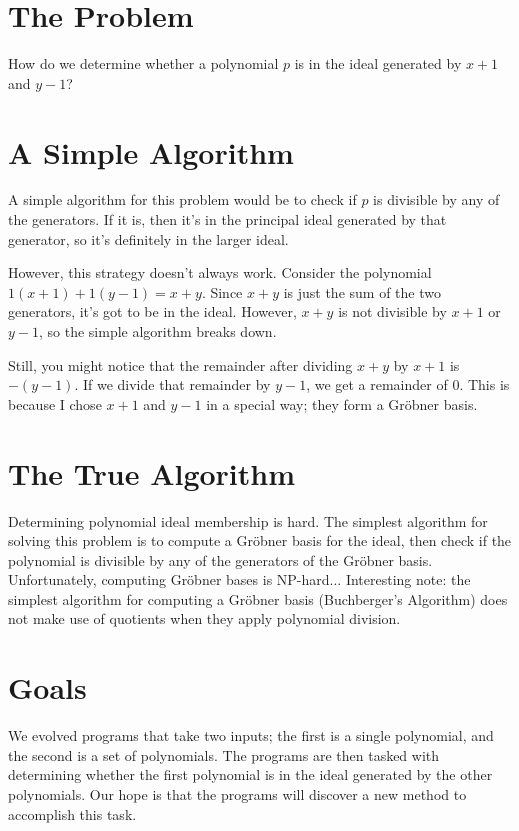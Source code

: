 \documentclass[20pt]{extarticle}
\begin{document}
\newpage
\section*{The Problem}

    How do we determine whether a polynomial $p$ is in the ideal generated by $x+1$ and $y-1$?

\newpage
\section*{A Simple Algorithm}

    A simple algorithm for this problem would be to check if $p$ is divisible by any of the generators.
    If it is, then it's in the principal ideal generated by that generator, so it's definitely in the larger ideal.

    However, this strategy doesn't always work.
    Consider the polynomial $1(x+1) + 1(y-1) = x + y$.
    Since $x+y$ is just the sum of the two generators, it's got to be in the ideal.
    However, $x + y$ is not divisible by $x+1$ or $y-1$, so the simple algorithm breaks down.

    Still, you might notice that the remainder after dividing $x+y$ by $x+1$ is $-(y-1)$.
    If we divide that remainder by $y-1$, we get a remainder of 0.
    This is because I chose $x+1$ and $y-1$ in a special way; they form a Gr\"obner basis.

\newpage
\section*{The True Algorithm}

    Determining polynomial ideal membership is hard.
    The simplest algorithm for solving this problem is to compute a Gr\"obner basis for the ideal, then check if the polynomial is divisible by any of the generators of the Gr\"obner basis.
    Unfortunately, computing Gr\"obner bases is NP-hard...
    Interesting note: the simplest algorithm for computing a Gr\"obner basis (Buchberger's Algorithm) does not make use of quotients when they apply polynomial division.

\newpage
\section*{Goals}

    We evolved programs that take two inputs; the first is a single polynomial, and the second is a set of polynomials.
    The programs are then tasked with determining whether the first polynomial is in the ideal generated by the other polynomials.
    Our hope is that the programs will discover a new method to accomplish this task.
\end{document}
